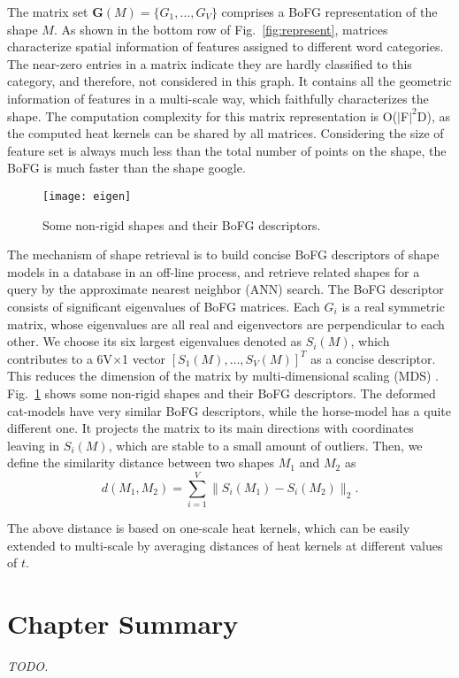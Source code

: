 The matrix set $\textbf{G}(M)=\{G_1,\dots,G_V\}$ comprises a BoFG representation of the shape $M$. As shown in the bottom row of Fig.~\ref{fig:represent}, matrices characterize spatial information of features assigned to different word categories. The near-zero entries in a matrix indicate they are hardly classified to this category, and therefore, not considered in this graph. It contains all the geometric information of features in a multi-scale way, which faithfully characterizes the shape. The computation complexity for this matrix representation is O($|$F$|^2$D), as the computed heat kernels can be shared by all matrices. Considering the size of feature set is always much less than the total number of points on the shape, the BoFG is much faster than the shape google.

\begin{figure}
\centering
\texttt{[image: eigen]}
\caption{Some non-rigid shapes and their BoFG descriptors.}
\label{fig:eigen}
\end{figure}

The mechanism of shape retrieval is to build concise BoFG descriptors of shape models in a database in an off-line process, and retrieve related shapes for a query by the approximate nearest neighbor (ANN) search. The BoFG descriptor consists of significant eigenvalues of BoFG matrices. Each $G_i$ is a real symmetric matrix, whose eigenvalues are all real and eigenvectors are perpendicular to each other. We choose its six largest eigenvalues denoted as $S_i(M)$, which contributes to a 6V$\times$1 vector $[S_1(M),\dots,S_V(M)]^T$ as a concise descriptor. This reduces the dimension of the matrix by multi-dimensional scaling (MDS) \cite{Bronstein2006}. Fig.~\ref{fig:eigen} shows some non-rigid shapes and their BoFG descriptors. The deformed cat-models have very similar BoFG descriptors, while the horse-model has a quite different one. It projects the matrix to its main directions with coordinates leaving in $S_i(M)$, which are stable to a small amount of outliers. Then, we define the similarity distance between two shapes $M_1$ and $M_2$ as
\begin{equation}
d(M_1,M_2)=\sum_{i=1}^{V}\|S_i(M_1)-S_i(M_2) \|_2.
\end{equation}

The above distance is based on one-scale heat kernels, which can be easily extended to multi-scale by averaging distances of heat kernels at different values of $t$.

\section{Chapter Summary}
\emph{TODO.}